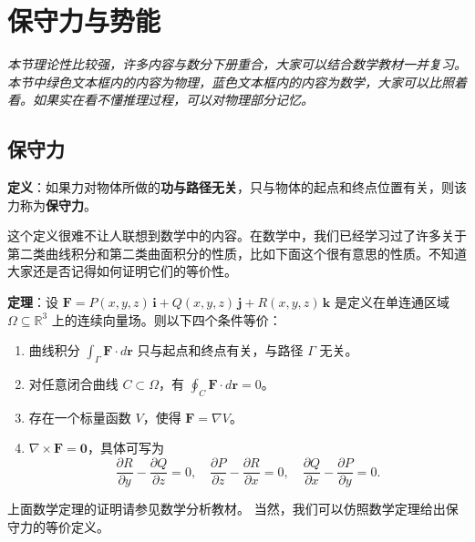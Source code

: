 \documentclass[UTF-8]{ctexart}
\begin{document}
\section{保守力与势能}
\textit{本节理论性比较强，许多内容与数分下册重合，大家可以结合数学教材一并复习。本节中绿色文本框内的内容为物理，蓝色文本框内的内容为数学，大家可以比照着看。如果实在看不懂推理过程，可以对物理部分记忆。}
\subsection{保守力}
\begin{tcolorbox}[colback=white!5!white,colframe=green!50!black,title=保守力的定义]
\textbf{定义}：如果力对物体所做的\textbf{功与路径无关}，只与物体的起点和终点位置有关，则该力称为\textbf{保守力}。

\end{tcolorbox}
这个定义很难不让人联想到数学中的内容。在数学中，我们已经学习过了许多关于第二类曲线积分和第二类曲面积分的性质，比如下面这个很有意思的性质。不知道大家还是否记得如何证明它们的等价性。
\begin{tcolorbox}[colback=white!5!white, colframe=blue!75!black, title=曲线积分与路径无关的等价条件]
\textbf{定理}：设 \(\mathbf{F} = P(x,y,z)\,\mathbf{i} + Q(x,y,z)\,\mathbf{j} + R(x,y,z)\,\mathbf{k}\) 是定义在单连通区域 \(\Omega \subseteq \mathbb{R}^3\) 上的连续向量场。则以下四个条件等价：
\begin{enumerate}
\item 曲线积分 \(\int_{\Gamma} \mathbf{F}\cdot d\mathbf{r}\) 只与起点和终点有关，与路径 \(\Gamma\) 无关。
\item 对任意闭合曲线 \(C \subset \Omega\)，有 \(\oint_{C} \mathbf{F}\cdot d\mathbf{r} = 0\)。
\item 存在一个标量函数 \(V\)，使得 \(\mathbf{F} = \nabla V\)。
\item \(\nabla \times \mathbf{F} = \mathbf{0}\)，具体可写为
\[
\frac{\partial R}{\partial y} - \frac{\partial Q}{\partial z} = 0,\quad
\frac{\partial P}{\partial z} - \frac{\partial R}{\partial x} = 0,\quad
\frac{\partial Q}{\partial x} - \frac{\partial P}{\partial y} = 0.
\]
\end{enumerate}
\end{tcolorbox}

上面数学定理的证明请参见数学分析教材。
当然，我们可以仿照数学定理给出保守力的等价定义。
\end{document}
